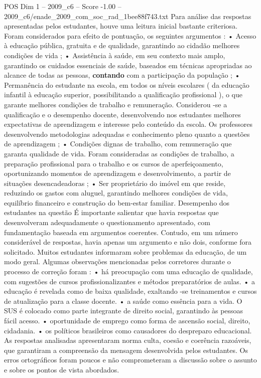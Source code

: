 \begin{textsample}{POS Dim 1 – 2009\_c6 – Score -1.00 – 2009\_c6/enade\_2009\_com\_soc\_rad\_1bee88f743.txt}
Para análise das respostas apresentadas pelos estudantes, houve uma leitura inicial bastante criteriosa.
Foram considerados para efeito de pontuação, os seguintes argumentos : • Acesso à educação pública, gratuita e de qualidade, garantindo ao cidadão melhores condições de vida ; • Assistência à saúde, em seu contexto mais amplo, garantindo os cuidados essenciais de saúde, baseados em técnicas apropriadas ao alcance de todas as pessoas, \textbf{contando} com a participação da população ; • Permanência do estudante na escola, em todos os níveis escolares ( da educação infantil à educação superior, possibilitando a qualificação profissional ), o que garante melhores condições de trabalho e remuneração.
Considerou -se a qualificação e o desempenho docente, desenvolvendo nos estudantes melhores expectativas de aprendizagem e interesse pelo conteúdo da escola.
Os professores desenvolvendo metodologias adequadas e conhecimento pleno quanto a questões de aprendizagem ; • Condições dignas de trabalho, com remuneração que garanta qualidade de vida.
Foram consideradas as condições de trabalho, a preparação profissional para o trabalho e os cursos de aperfeiçoamento, oportunizando momentos de aprendizagem e desenvolvimento, a partir de situações desencadeadoras ; • Ser proprietário do imóvel em que reside, reduzindo os gastos com aluguel, garantindo melhores condições de vida, equilíbrio financeiro e construção do bem-estar familiar.
Desempenho dos estudantes na questão É importante salientar que havia respostas que desenvolveram adequadamente o questionamento apresentado, com fundamentação baseada em argumentos coerentes.
Contudo, em um número considerável de respostas, havia apenas um argumento e não dois, conforme fora solicitado.
Muitos estudantes informaram sobre problemas da educação, de um modo geral.
Algumas observações mencionadas pelos corretores durante o processo de correção foram : • há preocupação com uma educação de qualidade, com sugestões de cursos profissionalizantes e métodos preparatórios de aulas. • a educação é revelada como de baixa qualidade, exaltando -se treinamentos e cursos de atualização para a classe docente. • a saúde como essência para a vida.
O SUS é colocado como parte integrante de direito social, garantindo às pessoas fácil acesso. • oportunidade de emprego como forma de ascensão social, direito, cidadania. • os políticos brasileiros como causadores do despreparo educacional.
As respostas analisadas apresentaram norma culta, coesão e coerência razoáveis, que garantiram a compreensão da mensagem desenvolvida pelos estudantes.
Os erros ortográficos foram poucos e não comprometeram a discussão sobre o assunto e sobre os pontos de vista abordados.

\end{textsample}
